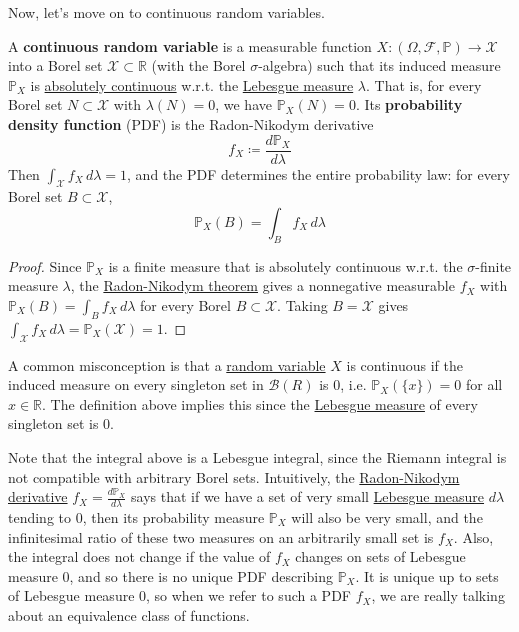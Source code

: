   Now, let's move on to continuous random variables. 

  \begin{definition}
    \label{def:continuous-random-variable}
    A \textbf{continuous random variable} is a measurable function $X: (\Omega, \mathcal{F}, \mathbb{P}) \to \mathcal{X}$ into a Borel set $\mathcal{X} \subset \mathbb{R}$ (with the Borel $\sigma$-algebra) such that its induced measure $\mathbb{P}_X$ is \hyperref[mt-def:absolutely-continuous-measures]{absolutely continuous} w.r.t. the \hyperref[mt-def:lebesgue-measure]{Lebesgue measure} $\lambda$. That is, for every Borel set $N \subset \mathcal{X}$ with $\lambda(N) = 0$, we have $\mathbb{P}_X (N) = 0$. Its \textbf{probability density function} (PDF) is the Radon-Nikodym derivative 
    \begin{equation}
      f_X \coloneqq \frac{d \mathbb{P}_X}{d \lambda}
    \end{equation}
    Then $\int_{\mathcal{X}} f_X \,d\lambda = 1$, and the PDF determines the entire probability law: for every Borel set $B \subset \mathcal{X}$, 
    \begin{equation}
      \mathbb{P}_X (B) = \int_B f_X \, d\lambda
    \end{equation}
  \end{definition}
  \begin{proof}
    Since $\mathbb{P}_X$ is a finite measure that is absolutely continuous w.r.t. the $\sigma$-finite measure $\lambda$, the \hyperref[mt-thm:rn-der]{Radon-Nikodym theorem} gives a nonnegative measurable $f_X$ with $\mathbb{P}_X (B) = \int_B f_X \,d\lambda$ for every Borel $B \subset \mathcal{X}$. Taking $B = \mathcal{X}$ gives $\int_{\mathcal{X}} f_X \,d\lambda = \mathbb{P}_X (\mathcal{X}) = 1$. 
  \end{proof}

  A common misconception is that a \hyperref[def:random-variable]{random variable} $X$ is continuous if the induced measure on every singleton set in $\mathcal{B}(R)$ is $0$, i.e. $\mathbb{P}_X (\{x\}) = 0$ for all $x \in \mathbb{R}$. The definition above implies this since the \hyperref[mt-def:lebesgue-measure]{Lebesgue measure} of every singleton set is $0$. 

  Note that the integral above is a Lebesgue integral, since the Riemann integral is not compatible with arbitrary Borel sets. Intuitively, the \hyperref[mt-thm:rn-der]{Radon-Nikodym derivative} $f_X = \frac{d \mathbb{P}_X}{d \lambda}$ says that if we have a set of very small \hyperref[mt-def:lebesgue-measure]{Lebesgue measure} $d \lambda$ tending to $0$, then its probability measure $\mathbb{P}_X$ will also be very small, and the infinitesimal ratio of these two measures on an arbitrarily small set is $f_X$. Also, the integral does not change if the value of $f_X$ changes on sets of Lebesgue measure $0$, and so there is no unique PDF describing $\mathbb{P}_X$. It is unique up to sets of Lebesgue measure $0$, so when we refer to such a PDF $f_X$, we are really talking about an equivalence class of functions. 


